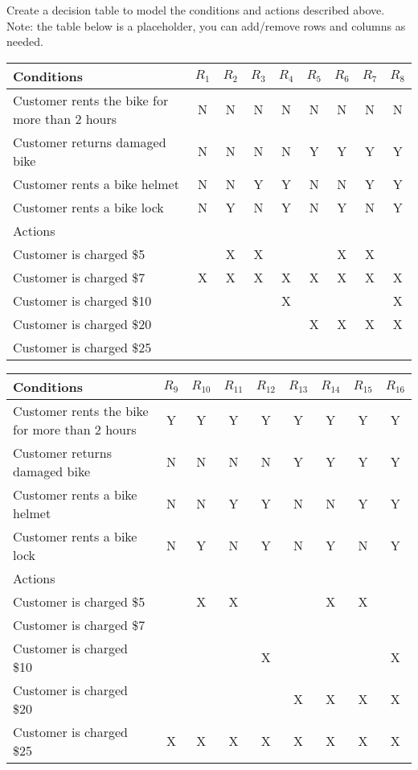 \documentclass{article}
\begin{document}
    Create a decision table to model the conditions and actions described above. Note: the
    table below is a placeholder, you can add/remove rows and columns as needed.
    
    \begin{center}
        \begin{tabular} {|l|c|c|c|c|c|c|c|c|}
            \hline
            Conditions & $R_1$ & $R_2$ & $R_3$ & $R_4$ & $R_5$ & $R_6$ & $R_7$ & $R_8$ \\
            \hline
            Customer rents the bike for more than 2 hours & N & N & N & N & N & N & N & N \\
            Customer returns damaged bike                 & N & N & N & N & Y & Y & Y & Y \\
            Customer rents a bike helmet                  & N & N & Y & Y & N & N & Y & Y \\
            Customer rents a bike lock                    & N & Y & N & Y & N & Y & N & Y \\
            \hline
            Actions & & & & & & & & \\
            \hline
            Customer is charged \$5  & &X&X& & &X&X& \\
            Customer is charged \$7  &X&X&X&X&X&X&X&X\\
            Customer is charged \$10 & & & &X& & & &X\\
            Customer is charged \$20 & & & & &X&X&X&X\\
            Customer is charged \$25 & & & & & & & & \\
            \hline
        \end{tabular}
    \end{center}
    \begin{center}
        \begin{tabular} {|l|c|c|c|c|c|c|c|c|}
            \hline
            Conditions & $R_9$ & $R_{10}$ & $R_{11}$ & $R_{12}$ & $R_{13}$ & $R_{14}$ & $R_{15}$ & $R_{16}$ \\
            \hline
            Customer rents the bike for more than 2 hours & Y & Y & Y & Y & Y & Y & Y & Y \\
            Customer returns damaged bike                 & N & N & N & N & Y & Y & Y & Y \\
            Customer rents a bike helmet                  & N & N & Y & Y & N & N & Y & Y \\
            Customer rents a bike lock                    & N & Y & N & Y & N & Y & N & Y \\
            \hline
            Actions & & & & & & & & \\
            \hline
            Customer is charged \$5  & &X&X& & &X&X& \\
            Customer is charged \$7  & & & & & & & & \\
            Customer is charged \$10 & & & &X& & & &X\\
            Customer is charged \$20 & & & & &X&X&X&X\\
            Customer is charged \$25 &X&X&X&X&X&X&X&X\\
            \hline
        \end{tabular}
    \end{center}
\end{document}
